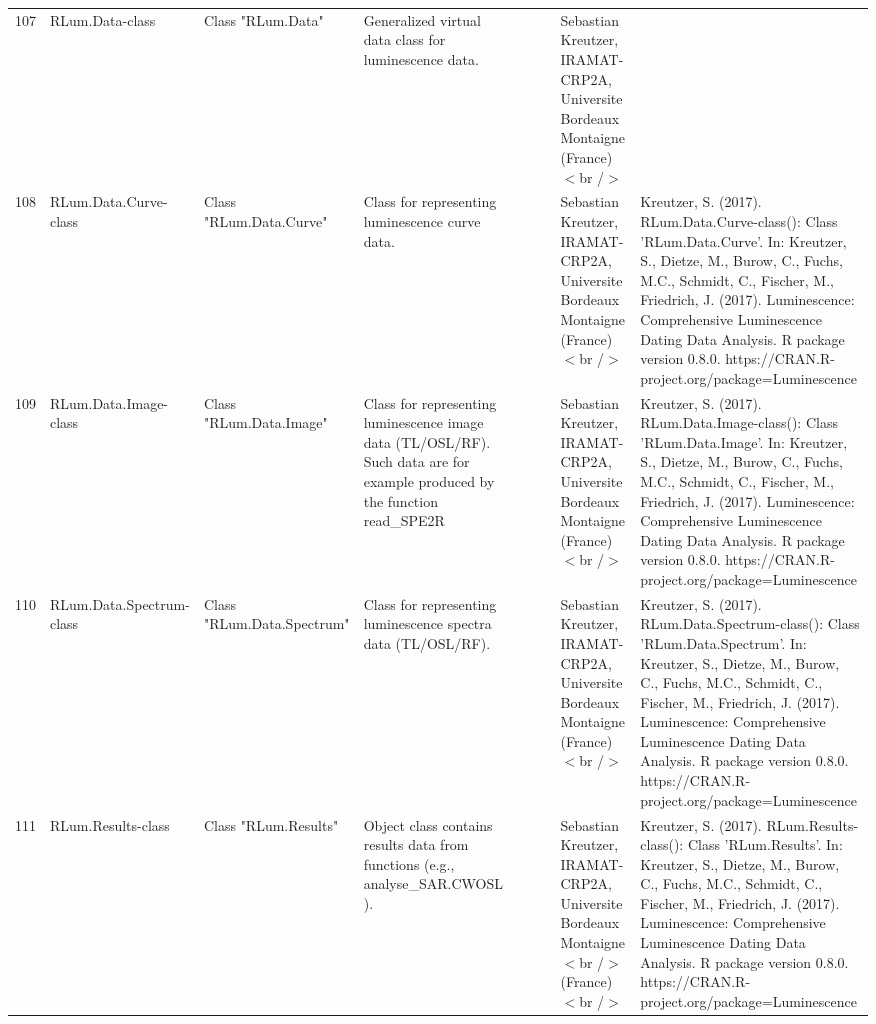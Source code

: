 \begin{table}[ht]
\begin{tabular}{rllllllll}
 \\ 
  107 & RLum.Data-class & Class  "RLum.Data" & Generalized virtual data class for luminescence data. &  &  &  & Sebastian Kreutzer, IRAMAT-CRP2A, Universite Bordeaux Montaigne (France)$<$br /$>$ &  \\ 
  108 & RLum.Data.Curve-class & Class  "RLum.Data.Curve" & Class for representing luminescence curve data. &  &  &  & Sebastian Kreutzer, IRAMAT-CRP2A, Universite Bordeaux Montaigne (France)$<$br /$>$ & Kreutzer, S. (2017). RLum.Data.Curve-class(): Class 'RLum.Data.Curve'. In: Kreutzer, S., Dietze, M., Burow, C., Fuchs, M.C., Schmidt, C., Fischer, M., Friedrich, J. (2017). Luminescence: Comprehensive Luminescence Dating Data Analysis. R package version 0.8.0. https://CRAN.R-project.org/package=Luminescence
 \\ 
  109 & RLum.Data.Image-class & Class  "RLum.Data.Image" & Class for representing luminescence image data (TL/OSL/RF). Such data are for example produced by the function  read\_SPE2R &  &  &  & Sebastian Kreutzer, IRAMAT-CRP2A, Universite Bordeaux Montaigne (France)$<$br /$>$ & Kreutzer, S. (2017). RLum.Data.Image-class(): Class 'RLum.Data.Image'. In: Kreutzer, S., Dietze, M., Burow, C., Fuchs, M.C., Schmidt, C., Fischer, M., Friedrich, J. (2017). Luminescence: Comprehensive Luminescence Dating Data Analysis. R package version 0.8.0. https://CRAN.R-project.org/package=Luminescence
 \\ 
  110 & RLum.Data.Spectrum-class & Class  "RLum.Data.Spectrum" & Class for representing luminescence spectra data (TL/OSL/RF). &  &  &  & Sebastian Kreutzer, IRAMAT-CRP2A, Universite Bordeaux Montaigne (France)$<$br /$>$ & Kreutzer, S. (2017). RLum.Data.Spectrum-class(): Class 'RLum.Data.Spectrum'. In: Kreutzer, S., Dietze, M., Burow, C., Fuchs, M.C., Schmidt, C., Fischer, M., Friedrich, J. (2017). Luminescence: Comprehensive Luminescence Dating Data Analysis. R package version 0.8.0. https://CRAN.R-project.org/package=Luminescence
 \\ 
  111 & RLum.Results-class & Class  "RLum.Results" & Object class contains results data from functions (e.g.,  analyse\_SAR.CWOSL ). &  &  &  & Sebastian Kreutzer, IRAMAT-CRP2A, Universite Bordeaux Montaigne$<$br /$>$ (France)$<$br /$>$ & Kreutzer, S. (2017). RLum.Results-class(): Class 'RLum.Results'. In: Kreutzer, S., Dietze, M., Burow, C., Fuchs, M.C., Schmidt, C., Fischer, M., Friedrich, J. (2017). Luminescence: Comprehensive Luminescence Dating Data Analysis. R package version 0.8.0. https://CRAN.R-project.org/package=Luminescence

\end{tabular}
\end{table}
